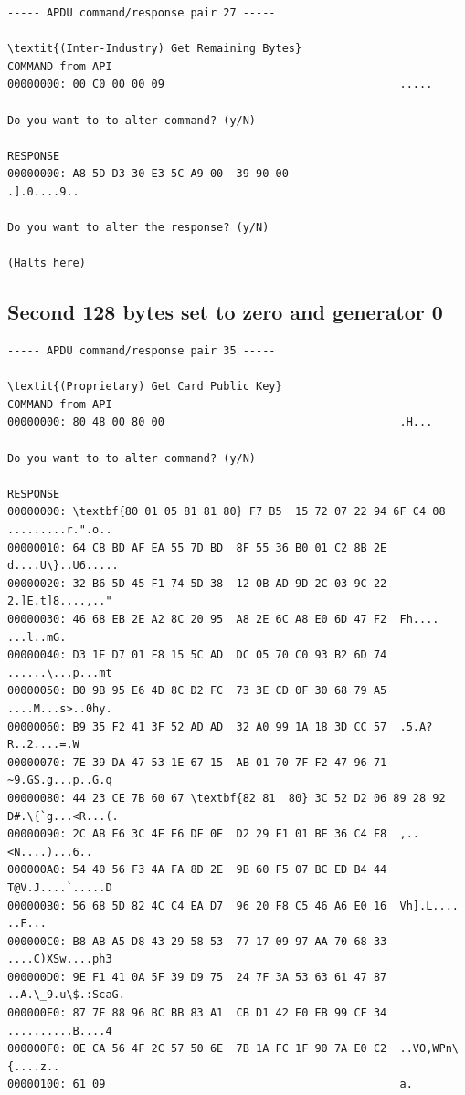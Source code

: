 \documentclass[bsc,frontabs,twoside,singlespacing,parskip,deptreport]{infthesis}     %
\begin{document}
\begin{appendices}
\begin{Verbatim}[commandchars=\\\{\}, fontsize=\small]
----- APDU command/response pair 27 -----

\textit{(Inter-Industry) Get Remaining Bytes}
COMMAND from API
00000000: 00 C0 00 00 09                                    .....

Do you want to to alter command? (y/N)

RESPONSE
00000000: A8 5D D3 30 E3 5C A9 00  39 90 00                 .].0....9..

Do you want to alter the response? (y/N)

(Halts here)
\end{Verbatim}
\subsection{Second 128 bytes set to zero and generator 0}
\begin{Verbatim}[commandchars=\\\{\}, fontsize=\small]
----- APDU command/response pair 35 -----

\textit{(Proprietary) Get Card Public Key}
COMMAND from API
00000000: 80 48 00 80 00                                    .H...

Do you want to to alter command? (y/N)

RESPONSE
00000000: \textbf{80 01 05 81 81 80} F7 B5  15 72 07 22 94 6F C4 08  .........r.".o..
00000010: 64 CB BD AF EA 55 7D BD  8F 55 36 B0 01 C2 8B 2E  d....U\}..U6.....
00000020: 32 B6 5D 45 F1 74 5D 38  12 0B AD 9D 2C 03 9C 22  2.]E.t]8....,.."
00000030: 46 68 EB 2E A2 8C 20 95  A8 2E 6C A8 E0 6D 47 F2  Fh.... ...l..mG.
00000040: D3 1E D7 01 F8 15 5C AD  DC 05 70 C0 93 B2 6D 74  ......\...p...mt
00000050: B0 9B 95 E6 4D 8C D2 FC  73 3E CD 0F 30 68 79 A5  ....M...s>..0hy.
00000060: B9 35 F2 41 3F 52 AD AD  32 A0 99 1A 18 3D CC 57  .5.A?R..2....=.W
00000070: 7E 39 DA 47 53 1E 67 15  AB 01 70 7F F2 47 96 71  ~9.GS.g...p..G.q
00000080: 44 23 CE 7B 60 67 \textbf{82 81  80} 3C 52 D2 06 89 28 92  D#.\{`g...<R...(.
00000090: 2C AB E6 3C 4E E6 DF 0E  D2 29 F1 01 BE 36 C4 F8  ,..<N....)...6..
000000A0: 54 40 56 F3 4A FA 8D 2E  9B 60 F5 07 BC ED B4 44  T@V.J....`.....D
000000B0: 56 68 5D 82 4C C4 EA D7  96 20 F8 C5 46 A6 E0 16  Vh].L.... ..F...
000000C0: B8 AB A5 D8 43 29 58 53  77 17 09 97 AA 70 68 33  ....C)XSw....ph3
000000D0: 9E F1 41 0A 5F 39 D9 75  24 7F 3A 53 63 61 47 87  ..A.\_9.u\$.:ScaG.
000000E0: 87 7F 88 96 BC BB 83 A1  CB D1 42 E0 EB 99 CF 34  ..........B....4
000000F0: 0E CA 56 4F 2C 57 50 6E  7B 1A FC 1F 90 7A E0 C2  ..VO,WPn\{....z..
00000100: 61 09                                             a.


\end{Verbatim}
\end{appendices}
\end{document}
